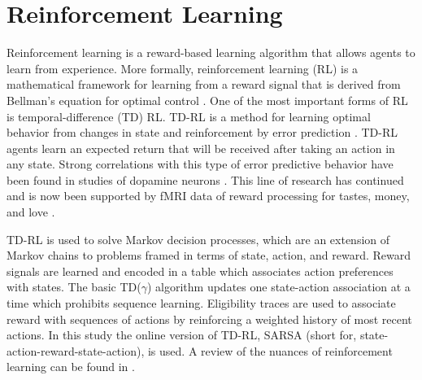 \section{Reinforcement Learning}
Reinforcement learning is a reward-based learning algorithm that allows agents
to learn from experience. More formally, reinforcement
learning (RL) is a mathematical framework for learning from a reward signal that
is derived from Bellman's equation for optimal control \cite{sutton1998introduction}. One of
the most important forms of RL is temporal-difference (TD) RL. TD-RL is a method
for learning optimal behavior from changes in state and reinforcement by error
prediction \cite{sutton1988learning}. TD-RL agents learn an expected return that will be
received after taking an action in any state. Strong correlations with this type of
error predictive behavior have been found in studies of dopamine neurons
\cite{schultz1993responses}. This line of research has continued and is now been
supported by fMRI data of reward processing for tastes, money, and love
\cite{haber2009reward}.

TD-RL is used to solve Markov decision processes, which are an extension of
Markov chains to problems framed in terms of state, action, and reward.
Reward signals are learned and encoded
in a table which associates action preferences with states. The basic
TD($\gamma$) algorithm updates one state-action association at a time which
prohibits sequence learning. Eligibility traces are used to associate reward
with sequences of actions by reinforcing a weighted history of most recent
actions. In this study the online version of TD-RL, SARSA (short for,
state-action-reward-state-action), is used. A review of the nuances of
reinforcement learning can be found in \cite{sutton1998introduction}.


